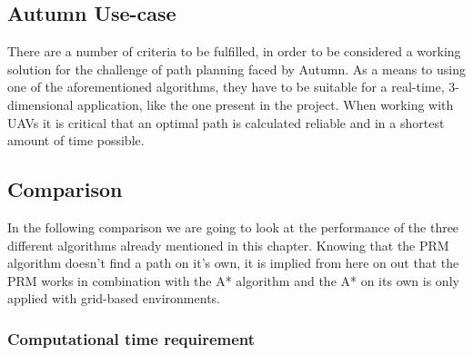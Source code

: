 \subsection{Autumn Use-case}

There are a number of criteria to be fulfilled, in order to be considered a working solution for the challenge of path planning faced by Autumn.
As a means to using one of the aforementioned algorithms, they have to be suitable for a real-time, 3-dimensional application, like the one present in the project.
When working with UAVs it is critical that an optimal path is calculated reliable and in a shortest amount of time possible. 

\subsection{Comparison}

In the following comparison we are going to look at the performance of the three different algorithms already mentioned in this chapter. Knowing that the PRM algorithm doesn't find a path on it's own, it is implied from here on out that the PRM works in combination with the A* algorithm and the A* on its own is only applied with grid-based environments.  

\subsubsection{Computational time requirement}

